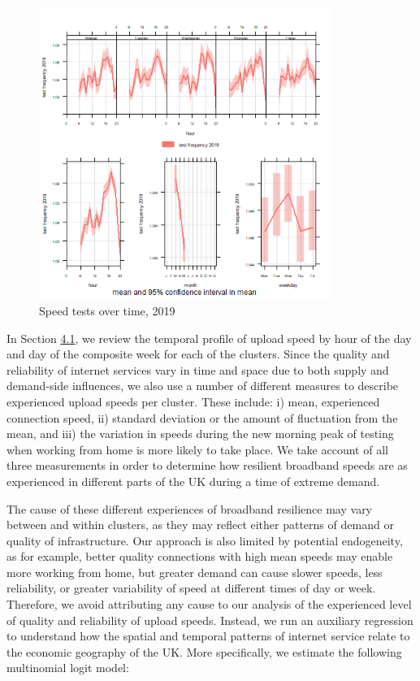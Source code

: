 \documentclass[]{interact}
\theoremstyle{plain}%
\theoremstyle{definition}
\theoremstyle{remark}
\begin{document}
\begin{figure}
\centering
\includegraphics[width=0.85\textwidth,height=0.5\textheight]{figures/time.var.plot2019.png}
\caption{Speed tests over time, 2019 \label{test2019}}
\end{figure}

In Section \protect\hyperlink{sec:4.1}{4.1}, we review the temporal
profile of upload speed by hour of the day and day of the composite week
for each of the clusters. Since the quality and reliability of internet
services vary in time and space due to both supply and demand-side
influences, we also use a number of different measures to describe
experienced upload speeds per cluster. These include: i) mean,
experienced connection speed, ii) standard deviation or the amount of
fluctuation from the mean, and iii) the variation in speeds during the
new morning peak of testing when working from home is more likely to
take place. We take account of all three measurements in order to
determine how resilient broadband speeds are as experienced in different
parts of the UK during a time of extreme demand.

The cause of these different experiences of broadband resilience may
vary between and within clusters, as they may reflect either patterns of
demand or quality of infrastructure. Our approach is also limited by
potential endogeneity, as for example, better quality connections with
high mean speeds may enable more working from home, but greater demand
can cause slower speeds, less reliability, or greater variability of
speed at different times of day or week. Therefore, we avoid attributing
any cause to our analysis of the experienced level of quality and
reliability of upload speeds. Instead, we run an auxiliary regression to
understand how the spatial and temporal patterns of internet service
relate to the economic geography of the UK. More specifically, we
estimate the following multinomial logit model:
\end{document}

